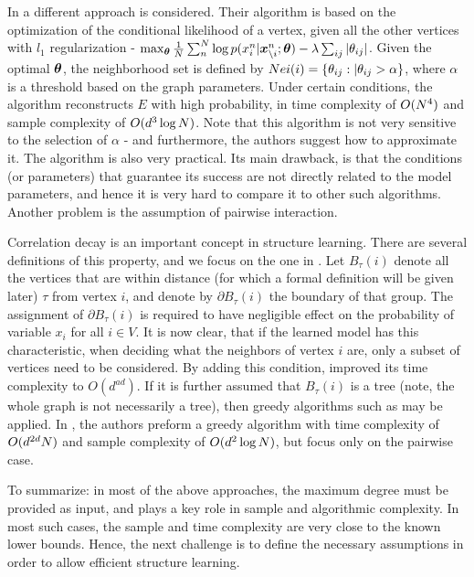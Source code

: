 In \cite{ravikumar2010high} a different approach is considered. Their algorithm is based on the optimization of the conditional likelihood of a vertex, given all the other vertices with $l_1$ regularization - $\max_{\boldsymbol{\theta}} \frac{1}{N}\sum_n^N \log p(x^n_i| \boldsymbol{x}^n_{\setminus i};\boldsymbol{\theta}) - \lambda \sum_{ij} |\theta_{ij}|$. Given the optimal $\boldsymbol{\theta}$, the neighborhood set is defined by $Nei(i) = \{\theta_{ij} : |\theta_{ij} > \alpha\}$, where $\alpha$ is a threshold based on the graph parameters. Under certain conditions, the algorithm reconstructs $E$ with high probability, in time complexity of $O({N}^4)$ and sample complexity of $O( d^3 \log {N})$. Note that this algorithm is not very sensitive to the selection of $\alpha$ - and furthermore, the authors suggest how to approximate it. The algorithm is also very practical. Its main drawback, is that the conditions (or parameters) that guarantee its success are not directly related to the model parameters, and hence it is very hard to compare it to other such algorithms. Another problem is the assumption of pairwise interaction.     

Correlation decay is an important concept in structure learning. There are several definitions of this property, and we focus on the one in \cite{montanari2009graphical}. Let $B_{\tau}(i)$ denote all the vertices that are within distance (for which a formal definition will be given later) $\tau$ from vertex $i$, and denote by $\partial B_{\tau}(i)$ the boundary of that group. The assignment of $\partial B_{\tau}(i)$ is required to have negligible effect on the probability of variable $x_i$ for all $i \in V$. It is now clear, that if the learned model has this characteristic, when deciding what the neighbors of vertex $i$ are, only a subset of vertices need to be considered. By adding this condition, \cite{bresler2008reconstruction} improved its time complexity to $O(d^{ad})$. If it is further assumed that $B_{\tau}(i)$ is a tree (note, the whole graph is not necessarily a tree), then greedy algorithms such as \cite{netrapalli2010greedy, anandkumar2013learning} may be applied. In \cite{anandkumar2013learning}, the authors preform a greedy algorithm with time complexity of $O(d^{2d}{N})$ and sample complexity of $O(d^2\log N)$, but focus only on the pairwise case.  

To summarize: in most of the above approaches, the maximum degree must be provided as input, and plays a key role in sample and algorithmic complexity. In most such cases, the sample and time complexity are very close to the known lower bounds. Hence, the next challenge is to define the necessary assumptions in order to allow efficient structure learning.


